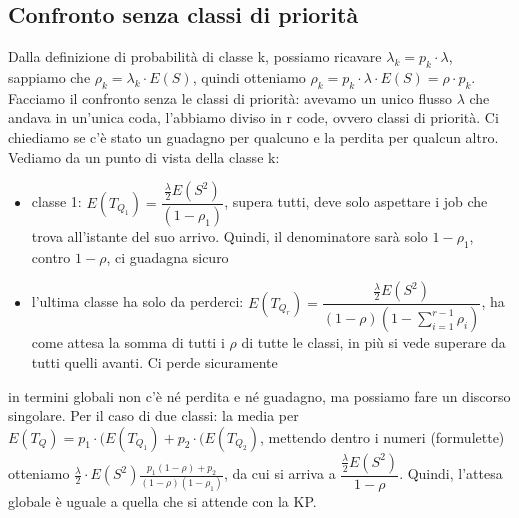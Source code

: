 \documentclass{article}
\begin{document}
\subsection{Confronto senza classi di priorità}
Dalla definizione di probabilità di classe k, possiamo ricavare $\lambda_k = p_k \cdot \lambda$, sappiamo che $\rho_k = \lambda_k \cdot E(S)$, quindi otteniamo $\rho_k = p_k \cdot \lambda \cdot E(S) = \rho \cdot p_k$. Facciamo il confronto senza le classi di priorità: avevamo un unico flusso $\lambda$ che andava in un'unica coda, l'abbiamo diviso in r code, ovvero classi di priorità. Ci chiediamo se c'è stato un guadagno per qualcuno e la perdita per qualcun altro. Vediamo da un punto di vista della classe k:
\begin{itemize}
\item classe 1: $E(T_{Q_1}) = \dfrac{\frac{\lambda}{2} E(S^2)}{(1 - \rho_1)}$, supera tutti, deve solo aspettare i job che trova all'istante del suo arrivo. Quindi, il denominatore sarà solo $1 - \rho_1$, contro $1 - \rho$, ci guadagna sicuro
\item l'ultima classe ha solo da perderci: $E(T_{Q_r}) = \dfrac{\frac{\lambda}{2} E(S^2)}{(1 - \rho) (1 - \sum\limits_{i=1}^{r-1} \rho_i)}$, ha come attesa la somma di tutti i $\rho$ di tutte le classi, in più si vede superare da tutti quelli avanti. Ci perde sicuramente
\end{itemize}
in termini globali non c'è né perdita e né guadagno, ma possiamo fare un discorso singolare. Per il caso di due classi: la media per $E(T_Q) = p_1 \cdot (E(T_{Q_1}) + p_2 \cdot (E(T_{Q_2})$, mettendo dentro i numeri (formulette) otteniamo $\frac{\lambda}{2}\cdot E(S^2) \frac{p_1(1 - \rho) + p_2}{(1 - \rho)(1 - \rho_1)}$, da cui si arriva a $\dfrac{\frac{\lambda}{2}E(S^2)}{1 - \rho}$. Quindi, l'attesa globale è uguale a quella che si attende con la KP.
\end{document}
